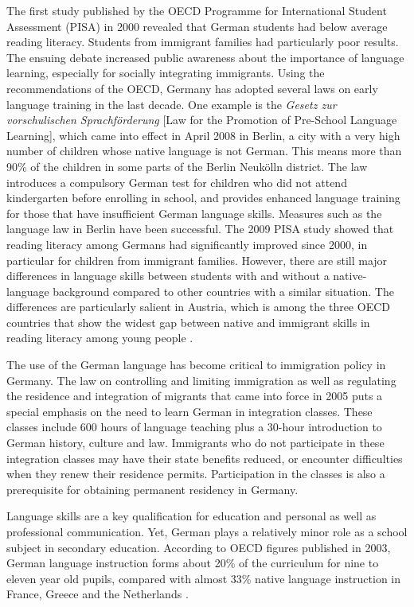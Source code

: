 \documentclass[]{../../metanetpaper}
\begin{document}
\begin{multicols}{2}
The first study published by the OECD Programme for International Student Assessment (PISA) in 2000 revealed that German students had below average reading literacy. Students from immigrant families had particularly poor results. The ensuing debate increased public awareness about the importance of language learning, especially for socially integrating immigrants. Using the recommendations of the OECD, Germany has adopted several laws on early language training in the last decade. One example is the \textit{Gesetz zur vorschulischen Sprachförderung} [Law for the Promotion of Pre-School Language Learning], which came into effect in April 2008 in Berlin, a city with a very high number of children whose native language is not German. This means more than 90\% of the children in some parts of the Berlin Neukölln district. The law introduces a compulsory German test for children who did not attend kindergarten before enrolling in school, and provides enhanced language training for those that have insufficient German language skills. Measures such as the language law in Berlin have been successful. The 2009 PISA study showed that reading literacy among Germans had significantly improved since 2000, in particular for children from immigrant families. However, there are still major differences in language skills between students with and without a native-language background compared to other countries with a similar situation. The differences are particularly salient in Austria, which is among the three OECD countries that show the widest gap between native and immigrant skills in reading literacy among young people \cite{Pisa1}.

The use of the German language has become critical to immigration policy in Germany. The law on controlling and limiting immigration as well as regulating the residence and integration of migrants that came into force in 2005 puts a special emphasis on the need to learn German in integration classes. These classes include 600 hours of language teaching plus a 30-hour introduction to German history, culture and law. Immigrants who do not participate in these integration classes may have their state benefits reduced, or encounter difficulties when they renew their residence permits. Participation in the classes is also a prerequisite for obtaining permanent residency in Germany.

Language skills are a key qualification for education and personal as well as professional communication. Yet, German plays a relatively minor role as a school subject in secondary education. According to OECD figures published in 2003, German language instruction forms about 20\% of the curriculum for nine to eleven year old pupils, compared with almost 33\% native language instruction in France, Greece and the Netherlands \cite{kmk1}.


\end{multicols}
\end{document}
